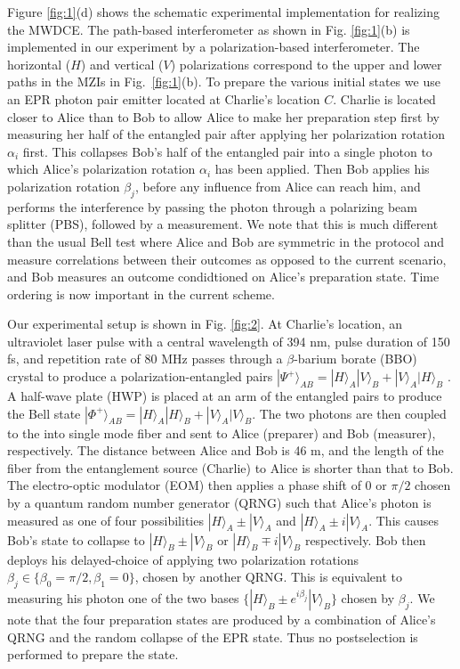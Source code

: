 \documentclass[aps,prl,twocolumn,amsmath,amssymb,nofootinbib,superscriptaddress]{revtex4-1}
\begin{document}
Figure \ref{fig:1}(d) shows the schematic experimental implementation for realizing the MWDCE.  The path-based interferometer as shown in Fig. \ref{fig:1}(b) is implemented in our experiment by a polarization-based interferometer.  The horizontal ($H$) and vertical ($V$) polarizations correspond to the upper and lower paths in the MZIs in Fig.~\ref{fig:1}(b). To prepare the various initial states we use an EPR photon pair emitter located at Charlie's location $C$. Charlie is located closer to Alice than to Bob to allow Alice to make her preparation step first by measuring her half of the entangled pair after applying her polarization rotation ${\alpha _i}$ first. This collapses Bob's half of the entangled pair into a single photon to which Alice's polarization rotation ${\alpha _i}$ has been applied. Then Bob applies his polarization rotation ${\beta _j}$, before any influence from Alice can reach him, and performs the interference by passing the photon through a polarizing beam splitter (PBS), followed by a measurement.  We note that this is much different than the usual Bell test where Alice and Bob are symmetric in the protocol and measure correlations between their outcomes as opposed to the current scenario, and Bob measures an outcome condidtioned on Alice's preparation state. Time ordering is now important in the current scheme.

Our experimental setup is shown in Fig. \ref{fig:2}. At Charlie's location, an ultraviolet laser pulse with a central wavelength of 394 nm, pulse duration of 150 fs, and repetition rate of 80 MHz passes through a $\beta$-barium borate (BBO) crystal to produce a polarization-entangled pairs $|{\Psi ^ + }{\rangle _{AB}} = |H{\rangle _A}|V{\rangle _B} + |V{\rangle _A}|H{\rangle _B}$ \cite{wang2016experimental}. A half-wave plate (HWP) is placed at an arm of the entangled pairs to produce the Bell state  $|{\Phi ^ + }{\rangle _{AB}} = |H{\rangle _A}|H{\rangle _B} + |V{\rangle _A}|V{\rangle _B}$. 
The two photons are then coupled to the into single mode fiber and sent to Alice (preparer) and Bob (measurer), respectively. The distance between Alice and Bob is 46 m, and the length of the fiber from the entanglement source (Charlie) to Alice is shorter than that to Bob. The electro-optic modulator (EOM) then applies a phase shift of 0  or $ \pi/2 $ chosen by a quantum random number generator (QRNG) such that Alice's photon is measured as one of four possibilities  $ |H \rangle_A \pm |V \rangle_A $ and $ |H \rangle_A \pm i |V \rangle_A $.  This causes Bob's state to collapse to $ |H \rangle_B \pm |V \rangle_B $ or $ |H \rangle_B \mp i |V \rangle_B $ respectively.  Bob then deploys his delayed-choice of applying two polarization rotations ${\beta _j} \in \{ {\beta _0} = \pi /2,{\beta _1} = 0\}$, chosen by another QRNG.  This is equivalent to measuring his photon one of the two bases $\{ |H{\rangle _B} \pm {e^{i{\beta _j}}}|V{\rangle _B} \}$ chosen by $\beta_j $.  We note that the four preparation states are produced by a combination of Alice's QRNG and the random collapse of the 
EPR state.  Thus no postselection is performed to prepare the state.  
\end{document}
